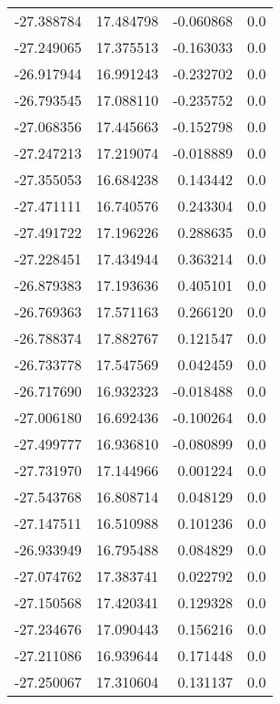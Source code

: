 \begin{tabular}{rrrr}
      -27.388784 &        17.484798 &   -0.060868 &   0.0 \\
      -27.249065 &        17.375513 &   -0.163033 &   0.0 \\
      -26.917944 &        16.991243 &   -0.232702 &   0.0 \\
      -26.793545 &        17.088110 &   -0.235752 &   0.0 \\
      -27.068356 &        17.445663 &   -0.152798 &   0.0 \\
      -27.247213 &        17.219074 &   -0.018889 &   0.0 \\
      -27.355053 &        16.684238 &    0.143442 &   0.0 \\
      -27.471111 &        16.740576 &    0.243304 &   0.0 \\
      -27.491722 &        17.196226 &    0.288635 &   0.0 \\
      -27.228451 &        17.434944 &    0.363214 &   0.0 \\
      -26.879383 &        17.193636 &    0.405101 &   0.0 \\
      -26.769363 &        17.571163 &    0.266120 &   0.0 \\
      -26.788374 &        17.882767 &    0.121547 &   0.0 \\
      -26.733778 &        17.547569 &    0.042459 &   0.0 \\
      -26.717690 &        16.932323 &   -0.018488 &   0.0 \\
      -27.006180 &        16.692436 &   -0.100264 &   0.0 \\
      -27.499777 &        16.936810 &   -0.080899 &   0.0 \\
      -27.731970 &        17.144966 &    0.001224 &   0.0 \\
      -27.543768 &        16.808714 &    0.048129 &   0.0 \\
      -27.147511 &        16.510988 &    0.101236 &   0.0 \\
      -26.933949 &        16.795488 &    0.084829 &   0.0 \\
      -27.074762 &        17.383741 &    0.022792 &   0.0 \\
      -27.150568 &        17.420341 &    0.129328 &   0.0 \\
      -27.234676 &        17.090443 &    0.156216 &   0.0 \\
      -27.211086 &        16.939644 &    0.171448 &   0.0 \\
      -27.250067 &        17.310604 &    0.131137 &   0.0 \\

\end{tabular}
